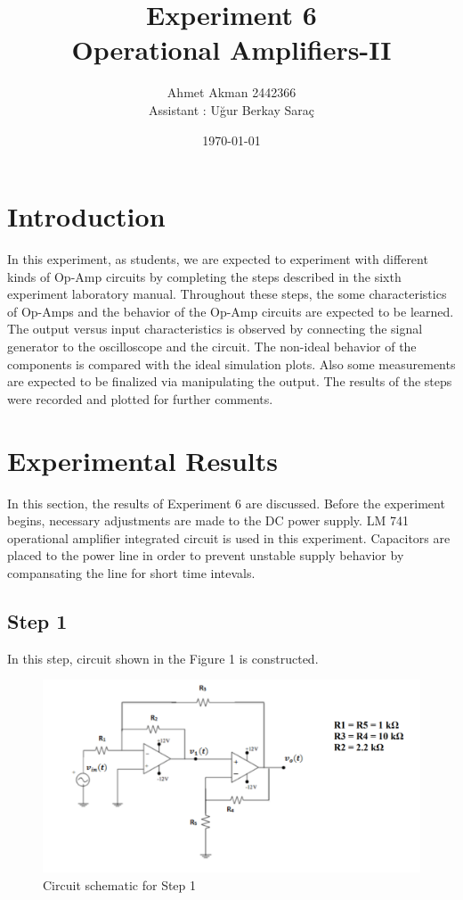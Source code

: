 \documentclass[letterpaper,12pt]{article}
\begin{document}
\title{Experiment 6 \protect\\Operational Amplifiers-II}
\author{Ahmet Akman 2442366 \protect\\ Assistant : Uğur Berkay Saraç}
\date{\today}
\maketitle
\newpage
\tableofcontents
\newpage

\section{Introduction} 
In this experiment, as students, we are expected to experiment with different kinds of Op-Amp circuits by completing the steps described in the sixth experiment laboratory manual. Throughout these steps, the some characteristics of Op-Amps and the behavior of the Op-Amp circuits are expected to be learned. The output versus input characteristics is observed by connecting the signal generator to the oscilloscope and the circuit. The non-ideal behavior of the components is compared with the ideal simulation plots. Also some measurements are expected to be finalized via manipulating the output. The results of the steps were recorded and plotted for further comments.
\section{Experimental Results}
In this section, the results of Experiment 6 are discussed. Before the experiment begins, necessary adjustments are made to the DC power supply. LM 741 operational amplifier integrated circuit is used in this experiment. Capacitors are placed to the power line in order to prevent unstable supply behavior by compansating the line for short time intevals.
\subsection{Step 1}
In this step, circuit shown in the Figure 1  is constructed. 
\begin{figure}[H]
	\centering
   \includegraphics[width=1\textwidth]{circuit_1.png}
   \caption{Circuit schematic for Step 1}
\end{figure}
\end{document}
